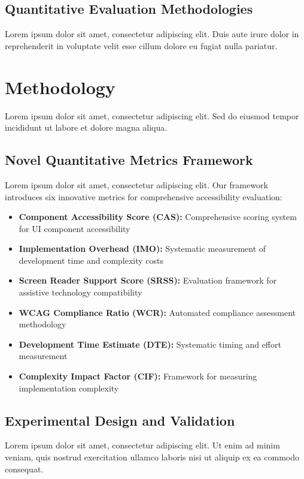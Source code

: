 \documentclass[sigconf]{acmart} %
\begin{document}
\subsection{Quantitative Evaluation Methodologies}
Lorem ipsum dolor sit amet, consectetur adipiscing elit. Duis aute irure dolor in reprehenderit in voluptate velit esse cillum dolore eu fugiat nulla pariatur.

\section{Methodology}
\label{sec:methodology}

Lorem ipsum dolor sit amet, consectetur adipiscing elit. Sed do eiusmod tempor incididunt ut labore et dolore magna aliqua.

\subsection{Novel Quantitative Metrics Framework}
Lorem ipsum dolor sit amet, consectetur adipiscing elit. Our framework introduces six innovative metrics for comprehensive accessibility evaluation:

\begin{itemize}
\item \textbf{Component Accessibility Score (CAS):} Comprehensive scoring system for UI component accessibility
\item \textbf{Implementation Overhead (IMO):} Systematic measurement of development time and complexity costs
\item \textbf{Screen Reader Support Score (SRSS):} Evaluation framework for assistive technology compatibility
\item \textbf{WCAG Compliance Ratio (WCR):} Automated compliance assessment methodology
\item \textbf{Development Time Estimate (DTE):} Systematic timing and effort measurement
\item \textbf{Complexity Impact Factor (CIF):} Framework for measuring implementation complexity
\end{itemize}

\subsection{Experimental Design and Validation}
Lorem ipsum dolor sit amet, consectetur adipiscing elit. Ut enim ad minim veniam, quis nostrud exercitation ullamco laboris nisi ut aliquip ex ea commodo consequat.
\end{document}
